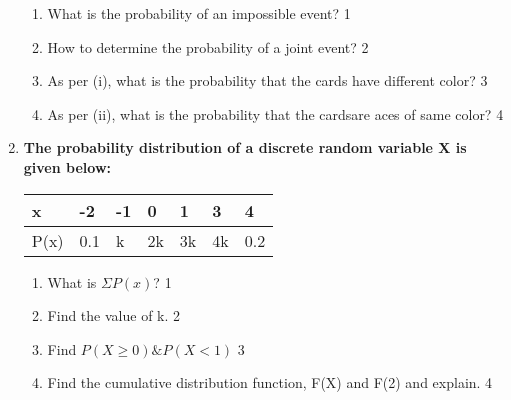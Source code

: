 \documentclass{article}
\begin{document}
\begin{enumerate}
  \begin{enumerate}
    \item
	What is the probability of an impossible event? \hfill 1
    \item
	How to determine the probability of a joint event?  \hfill 2
    \item  
	As per (i), what is the probability that the cards have different color? \hfill 3
    \item
	As per (ii), what is the probability that the cardsare aces of same color?  \hfill 4
  \end{enumerate}

 \item
	  \textbf{The probability distribution of a discrete random variable X is given below:} 

	  \begin{table}[h]
	  \begin{center}
\begin{tabular}{lllllll}
x    & -2   & -1 & 0   & 1 & 3 & 4   \\ \hline
P(x) & 0.1 & k & 2k & 3k & 4k & 0.2
\end{tabular} 
\end{center}	
\end{table}
  
  \begin{enumerate}
    \item
	What is $\Sigma P(x)$? \hfill 1
    \item
	Find the value of k. \hfill 2
    \item  
	Find $P(X \geq 0) \& P(X < 1)$ \hfill 3
    \item
	Find the cumulative distribution function, F(X) and F(2) and explain. \hfill 4
  \end{enumerate}
  \end{enumerate}
\end{document}
